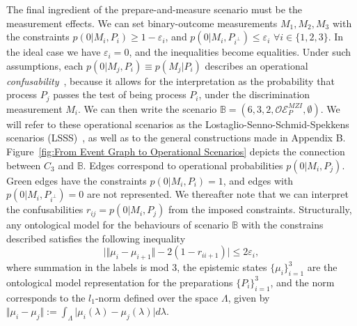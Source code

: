 \documentclass[letterpaper,onecolumn,12pt,accepted=2024-01-17]{article}
\begin{document}
The final ingredient of the prepare-and-measure scenario must be the measurement effects. We can set binary-outcome measurements $M_1, M_2, M_3$ with the constraints $p(0\vert M_i,P_i)\geq 1-\varepsilon_i$, and $p(0 \vert M_i, P_{i^\perp})\leq \varepsilon_i$ $\forall i \in \{1,2,3\}$. In the ideal case we have $\varepsilon_i=0$, and the inequalities become equalities. Under such assumptions, each $p(0\vert M_j,P_i)\equiv p(M_j\vert P_i)$ describes an operational \textit{confusability}~\cite{schmid2018discrimination}, because it allows for the interpretation as the probability that process $P_j$ passes the test of being process $P_i$, under the discrimination measurement $M_i$. We can then write the scenario $\mathbb{B} = (6,3,2,\mathcal{OE}_P^{MZI},\emptyset)$. We will refer to these operational scenarios as the Lostaglio-Senno-Schmid-Spekkens scenarios (LSSS)~\cite{Lostaglio2020contextualadvantage,schmid2018discrimination}, as well as to the general constructions made in Appendix B. Figure~\ref{fig:From Event Graph to Operational Scenarios} depicts the connection between $C_3$ and $\mathbb{B}$. Edges correspond to operational probabilities $p(0 \vert M_i, P_j)$. Green edges have the constraints  $p(0\vert M_i ,P_i)=1$, and edges with $p(0\vert M_i ,P_{i^\perp})=0$ are not represented. We thereafter note that we can interpret the confusabilities $r_{ij} = p(0\vert M_i, P_j)$ from the imposed constraints. Structurally, any ontological model for the behaviours of scenario $\mathbb{B}$ with the constrains described satisfies the following inequality~\cite{Lostaglio2020contextualadvantage}
\begin{equation}\label{eq: LSSS structure}
    \vert \Vert \mu_i - \mu_{i+1}\Vert - 2(1-r_{i i+1}) \vert \leq 2\varepsilon_i ,
\end{equation}
where summation in the labels is mod 3, the epistemic states $\{\mu_i\}_{i=1}^3$ are the ontological model representation for the preparations $\{P_i\}_{i=1}^3$, and the norm corresponds to the $l_1$-norm defined over the space $\Lambda$, given by $\Vert \mu_i - \mu_j \Vert := \int_\Lambda \vert \mu_i(\lambda) - \mu_j(\lambda)\vert d\lambda$. 
\end{document}

